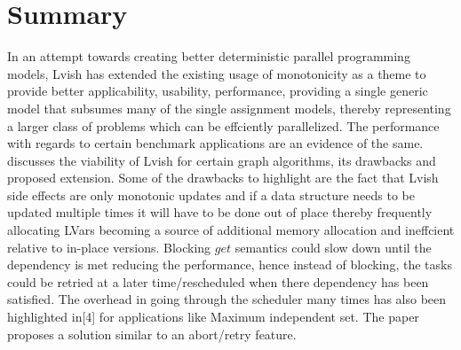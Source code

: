 \documentclass[twocolumn]{article}
\begin{document}
\section{Summary}
\label{summary}
In an attempt towards creating better deterministic parallel programming models, Lvish has extended the existing usage of monotonicity as a theme to provide better applicability, usability, performance, providing a single generic model that subsumes
many of the single assignment models, thereby representing a larger class of problems which can be effciently parallelized. The performance with regards to certain benchmark applications are an evidence of the same. \cite{newton1}discusses the viability of Lvish for certain graph algorithms, its drawbacks and proposed extension. Some of the drawbacks to highlight are the fact that Lvish side  effects are only monotonic updates and if a data structure needs to be updated multiple times it will have to be done out of
place thereby frequently allocating LVars becoming a source of additional memory allocation and ineffcient relative to in-place versions. Blocking $get$ semantics could slow down until the dependency is met reducing the performance, hence instead
of blocking, the tasks could be retried at a later time/rescheduled when there dependency has been satisfied. The overhead in going through the scheduler many times has also been highlighted in[4] for applications like Maximum independent set. The
paper proposes a solution similar to an abort/retry feature.

 
\end{document}
